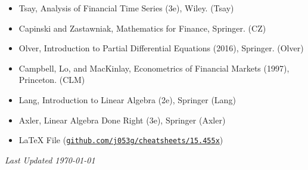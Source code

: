 \documentclass[10pt,landscape,a4paper]{article}
\begin{document}
\begin{multicols*}{3}
\begin{itemize}
\item Tsay, Analysis of Financial Time Series (3e), Wiley. (Tsay)
\item Capinski and Zastawniak, Mathematics for Finance, Springer. (CZ)
\item Olver, Introduction to Partial Differential Equations (2016), Springer. (Olver)
\item Campbell, Lo, and MacKinlay, Econometrics of Financial Markets (1997), Princeton. (CLM)
\item Lang, Introduction to Linear Algebra (2e), Springer (Lang)
\item Axler, Linear Algebra Done Right (3e), Springer (Axler)
\item LaTeX File (\texttt{\href{https://github.com/j053g/cheatsheets/blob/main/15.455x/15.455x_math_methods_for_quant_finance.tex}{github.com/j053g/cheatsheets/15.455x}})
\end{itemize}

\begin{center}
	\emph{Last Updated \today}
\end{center}

\end{multicols*}
\end{document}
